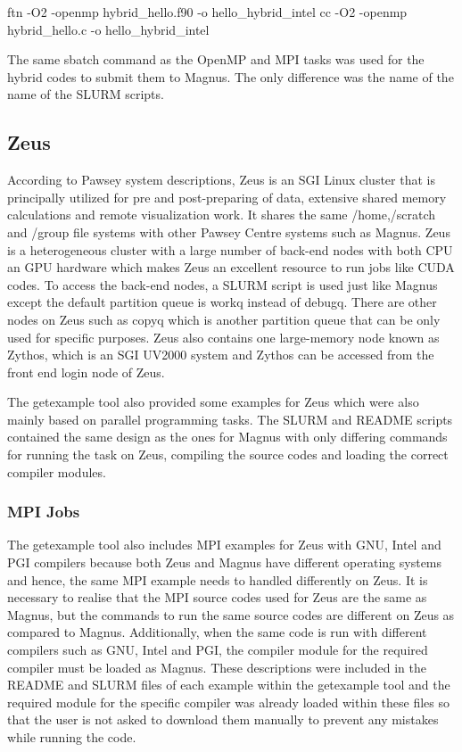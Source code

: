 \documentclass[journal]{IEEEtran}
\begin{document}
ftn -O2 -openmp hybrid_hello.f90 -o hello_hybrid_intel
cc -O2 -openmp hybrid_hello.c -o hello_hybrid_intel

The same sbatch command as the OpenMP and MPI tasks was used for the hybrid codes to submit them to Magnus. The only difference was the name of the name
of the SLURM scripts.

\subsection{Zeus}

According to Pawsey system descriptions, Zeus is an SGI Linux cluster that is principally utilized for pre and post-preparing of data, extensive shared 
memory calculations and remote visualization work. It shares the same /home,/scratch and /group file systems with other Pawsey Centre systems such as 
Magnus. Zeus is a heterogeneous cluster with a large number of back-end nodes with both CPU an GPU hardware which makes Zeus an excellent resource to run
jobs like CUDA codes. To access the back-end nodes, a SLURM script is used just like Magnus except the default partition queue is workq instead of 
debugq. There are other nodes on Zeus such as copyq which is another partition queue that can be only used for specific purposes. Zeus also contains one 
large-memory node known as Zythos, which is an SGI UV2000 system and Zythos can be accessed from the front end login node of
Zeus. 

The getexample tool also provided some examples for Zeus which were also mainly based on parallel programming tasks. The SLURM and README scripts
contained the same design as the ones for Magnus with only differing commands for running the task on Zeus, compiling the source codes and loading the
correct compiler modules. 
 
\subsubsection{MPI Jobs}

The getexample tool also includes MPI examples for Zeus with GNU, Intel and PGI compilers because both Zeus and Magnus have different operating systems 
and hence, the same MPI example needs to handled differently on Zeus. It is necessary to realise that the MPI source codes used for Zeus are the same
as Magnus, but the commands to run the same source codes are different on Zeus as compared to Magnus. Additionally, when the same code is run 
with different compilers such as GNU, Intel and PGI, the compiler module for the required compiler must be loaded as Magnus. These descriptions were
included in the README and SLURM files of each example within the getexample tool and the required module for the specific compiler was already loaded 
within these files so that the user is not asked to download them manually to prevent any mistakes while running the code.
\end{document}
